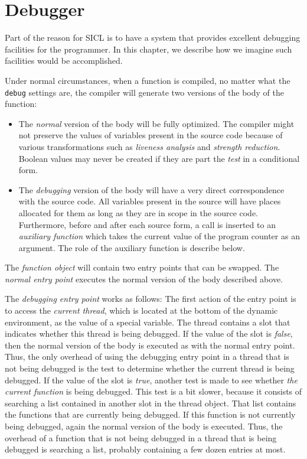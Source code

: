 \chapter{Debugger}
\label{chap-debugger}

Part of the reason for SICL is to have a system that provides
excellent debugging facilities for the programmer.  In this chapter,
we describe how we imagine such facilities would be accomplished.

Under normal circumstances, when a function is compiled, no matter
what the \texttt{debug} settings are, the compiler will generate two
versions of the body of the function:

\begin{itemize}
\item The \emph{normal} version of the body will be fully optimized.
  The compiler might not preserve the values of variables present in
  the source code because of various transformations such as
  \emph{liveness analysis} and \emph{strength reduction}.  Boolean
  values may never be created if they are part the \emph{test} in a
  conditional form.
\item The \emph{debugging} version of the body will have a very direct
  correspondence with the source code.  All variables present in the
  source will have places allocated for them as long as they are in
  scope in the source code.  Furthermore, before and after each source
  form, a call is inserted to an \emph{auxiliary function} which takes
  the current value of the program counter as an argument.  The role
  of the auxiliary function is describe below.
\end{itemize}

The \emph{function object} will contain two entry points that can be
swapped.  The \emph{normal entry point} executes the normal version of
the body described above.

The \emph{debugging entry point} works as follows: The first action of
the entry point is to access the \emph{current thread}, which is
located at the bottom of the dynamic environment, as the value of a
special variable.  The thread contains a slot that indicates whether
this thread is being debugged.  If the value of the slot is
\emph{false}, then the normal version of the body is executed as with
the normal entry point.  Thus, the only overhead of using the
debugging entry point in a thread that is not being debugged is the
test to determine whether the current thread is being debugged.  If
the value of the slot is \emph{true}, another test is made to see
whether \emph{the current function} is being debugged.  This test is a
bit slower, because it consists of searching a list contained in
another slot in the thread object.  That list contains the functions
that are currently being debugged.  If this function is not currently
being debugged, again the normal version of the body is executed.
Thus, the overhead of a function that is not being debugged in a
thread that is being debugged is searching a list, probably containing
a few dozen entries at most.


